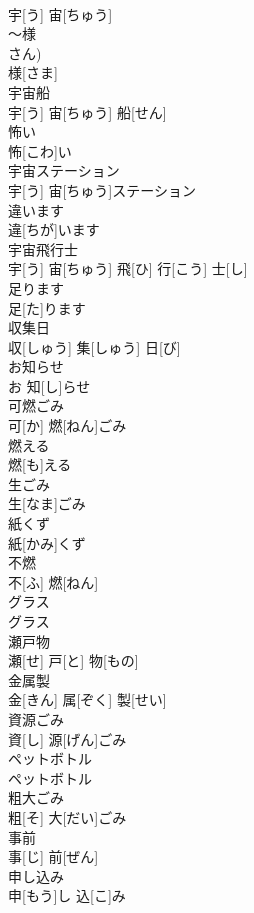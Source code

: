 \documentclass[8pt]{extreport}
\begin{document}
\begin{CJK}{UTF8}{min}
\\	宇[う] 宙[ちゅう]		
\\	～様	
\\	さん)	
\\	様[さま]		
\\	宇宙船	
\\	宇[う] 宙[ちゅう] 船[せん]		
\\	怖い	
\\	怖[こわ]い		
\\	宇宙ステーション	
\\	宇[う] 宙[ちゅう]ステーション		
\\	違います	
\\	違[ちが]います		
\\	宇宙飛行士	
\\	宇[う] 宙[ちゅう] 飛[ひ] 行[こう] 士[し]		
\\	足ります	
\\	足[た]ります		
\\	収集日	
\\	収[しゅう] 集[しゅう] 日[び]		
\\	お知らせ	
\\	お 知[し]らせ		
\\	可燃ごみ	
\\	可[か] 燃[ねん]ごみ		
\\	燃える	
\\	燃[も]える		
\\	生ごみ	
\\	生[なま]ごみ		
\\	紙くず	
\\	紙[かみ]くず		
\\	不燃	
\\	不[ふ] 燃[ねん]		
\\	グラス	
\\	グラス		
\\	瀬戸物	
\\	瀬[せ] 戸[と] 物[もの]		
\\	金属製	
\\	金[きん] 属[ぞく] 製[せい]		
\\	資源ごみ	
\\	資[し] 源[げん]ごみ		
\\	ペットボトル	
\\	ペットボトル		
\\	粗大ごみ	
\\	粗[そ] 大[だい]ごみ		
\\	事前	
\\	事[じ] 前[ぜん]		
\\	申し込み	
\\	申[もう]し 込[こ]み		

\end{CJK}
\end{document}
